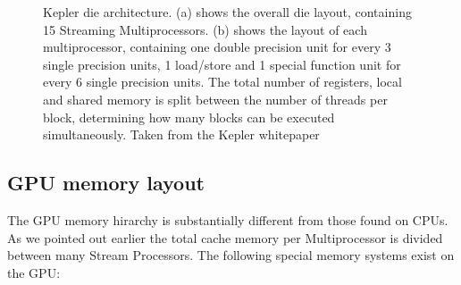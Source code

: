 \begin{figure}[ht!]
\begin{mdframed}
\begin{subfigure}[b]{0.6\textwidth}
    \caption{}
  \end{subfigure}
  \caption[Kepler architecture]{Kepler die architecture. (a) shows the overall die layout, containing 15 Streaming Multiprocessors. (b) shows the layout of each multiprocessor, containing one double precision unit for every 
				3 single precision units, 1 load/store and 1 special function unit for every 6 single precision units. The total number of registers, local and shared memory is split between the number of threads per 
				block, determining how many blocks can be executed simultaneously. Taken from the Kepler whitepaper \cite{kepler}}
  \label{fig_kepler_arch}
 \end{mdframed}
\end{figure}

\subsection{GPU memory layout}
The GPU memory hirarchy is substantially different from those found on CPUs. As we pointed out earlier the total cache memory
per Multiprocessor is divided between many Stream Processors. The following special memory systems exist on the GPU:
